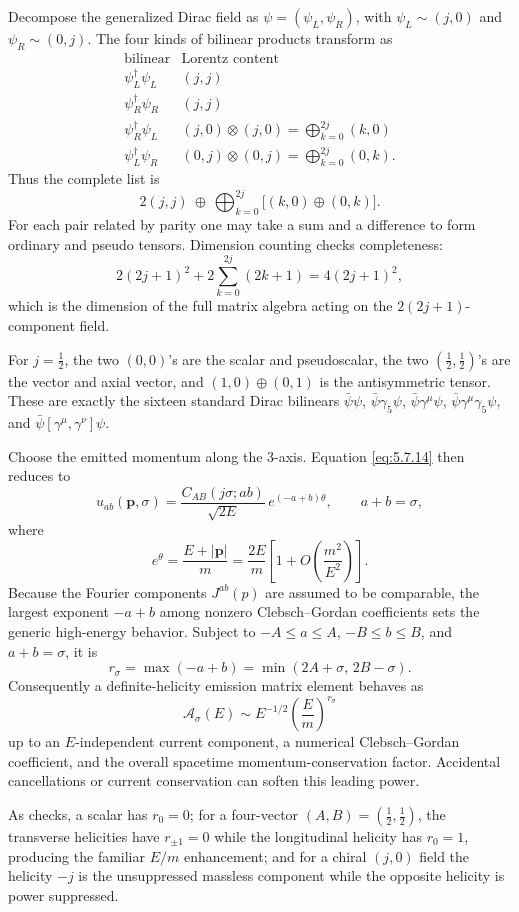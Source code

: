 \begin{enumerate}
Decompose the generalized Dirac field as
\(\psi=(\psi_L,\psi_R)\), with
\(\psi_L\sim(j,0)\) and \(\psi_R\sim(0,j)\).
The four kinds of bilinear products transform as
\[
\begin{array}{c|c}
\text{bilinear}&\text{Lorentz content}\\ \hline
\psi_L^\dagger\psi_L&(j,j)\\
\psi_R^\dagger\psi_R&(j,j)\\
\psi_R^\dagger\psi_L&
(j,0)\otimes(j,0)=\displaystyle\bigoplus_{k=0}^{2j}(k,0)\\
\psi_L^\dagger\psi_R&
(0,j)\otimes(0,j)=\displaystyle\bigoplus_{k=0}^{2j}(0,k).
\end{array}
\]
Thus the complete list is
\[
 2(j,j)\ \oplus\
 \bigoplus_{k=0}^{2j}\bigl[(k,0)\oplus(0,k)\bigr].
\]
For each pair related by parity one may take a sum and a difference to form
ordinary and pseudo tensors.  Dimension counting checks completeness:
\[
 2(2j+1)^2+
 2\sum_{k=0}^{2j}(2k+1)
 =4(2j+1)^2,
\]
which is the dimension of the full matrix algebra acting on the
\(2(2j+1)\)-component field.

For \(j=\tfrac12\), the two \((0,0)\)'s are the scalar and pseudoscalar,
the two \((\tfrac12,\tfrac12)\)'s are the vector and axial vector, and
\((1,0)\oplus(0,1)\) is the antisymmetric tensor.  These are exactly the
sixteen standard Dirac bilinears
\(\bar\psi\psi\), \(\bar\psi\gamma_5\psi\),
\(\bar\psi\gamma^\mu\psi\),
\(\bar\psi\gamma^\mu\gamma_5\psi\), and
\(\bar\psi[\gamma^\mu,\gamma^\nu]\psi\).

Choose the emitted momentum along the 3-axis.  Equation
\eqref{eq:5.7.14} then reduces to
\[
 u_{ab}(\mathbf p,\sigma)=
 \frac{C_{AB}(j\sigma;ab)}{\sqrt{2E}}\,
 e^{(-a+b)\theta},
 \qquad a+b=\sigma,
\]
where
\[
 e^\theta=\frac{E+|\mathbf p|}{m}
 =\frac{2E}{m}\left[1+O\!\left(\frac{m^2}{E^2}\right)\right].
\]
Because the Fourier components \(J^{ab}(p)\) are assumed to be comparable,
the largest exponent \(-a+b\) among nonzero Clebsch--Gordan coefficients
sets the generic high-energy behavior.  Subject to
\(-A\leq a\leq A\), \(-B\leq b\leq B\), and \(a+b=\sigma\), it is
\[
 r_\sigma=\max(-a+b)
 =\min(2A+\sigma,\,2B-\sigma).
\]
Consequently a definite-helicity emission matrix element behaves as
\[
 \mathcal A_\sigma(E)\sim
 E^{-1/2}\left(\frac{E}{m}\right)^{r_\sigma}
\]
up to an \(E\)-independent current component, a numerical
Clebsch--Gordan coefficient, and the overall spacetime
momentum-conservation factor.  Accidental cancellations or current
conservation can soften this leading power.

As checks, a scalar has \(r_0=0\); for a four-vector
\((A,B)=(\tfrac12,\tfrac12)\), the transverse helicities have
\(r_{\pm1}=0\) while the longitudinal helicity has \(r_0=1\), producing the
familiar \(E/m\) enhancement; and for a chiral \((j,0)\) field the helicity
\(-j\) is the unsuppressed massless component while the opposite helicity is
power suppressed.
\end{enumerate}
